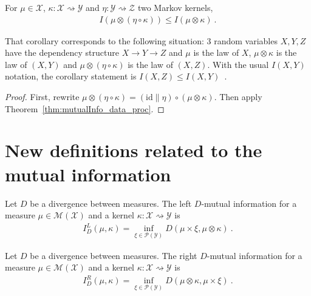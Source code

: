 \begin{corollary}
  \label{cor:mutualInfo_compProd_le}
  For $\mu \in \mathcal X$, $\kappa : \mathcal X \rightsquigarrow \mathcal Y$ and $\eta : \mathcal Y \rightsquigarrow \mathcal Z$ two Markov kernels,
  \begin{align*}
  I(\mu \otimes (\eta \circ \kappa)) \le I(\mu \otimes \kappa)
  \: .
  \end{align*}
\end{corollary}

That corollary corresponds to the following situation: 3 random variables $X, Y, Z$ have the dependency structure $X \to Y \to Z$ and $\mu$ is the law of $X$, $\mu \otimes \kappa$ is the law of $(X, Y)$ and $\mu \otimes (\eta \circ \kappa)$ is the law of $(X, Z)$.
With the usual $I(X, Y)$ notation, the corollary statement is $I(X, Z) \le I(X, Y)$~.

\begin{proof}%
{}
First, rewrite $\mu \otimes (\eta \circ \kappa) = (\mathrm{id} \parallel \eta) \circ (\mu \otimes \kappa)$. Then apply Theorem~\ref{thm:mutualInfo_data_proc}.
\end{proof}




\section{New definitions related to the mutual information}

\begin{definition}
  \label{def:mutualInfoLeft}
  Let $D$ be a divergence between measures.
  The left $D$-mutual information for a measure $\mu \in \mathcal M(\mathcal X)$ and a kernel $\kappa : \mathcal X \rightsquigarrow \mathcal Y$ is
  \begin{align*}
  I_D^L(\mu, \kappa) = \inf_{\xi \in \mathcal P(\mathcal Y)} D(\mu \times \xi, \mu \otimes \kappa) \: .
  \end{align*}
\end{definition}


\begin{definition}
  \label{def:mutualInfoRight}
  Let $D$ be a divergence between measures.
  The right $D$-mutual information for a measure $\mu \in \mathcal M(\mathcal X)$ and a kernel $\kappa : \mathcal X \rightsquigarrow \mathcal Y$ is
  \begin{align*}
  I_D^R(\mu, \kappa) = \inf_{\xi \in \mathcal P(\mathcal Y)} D(\mu \otimes \kappa, \mu \times \xi) \: .
  \end{align*}
\end{definition}


